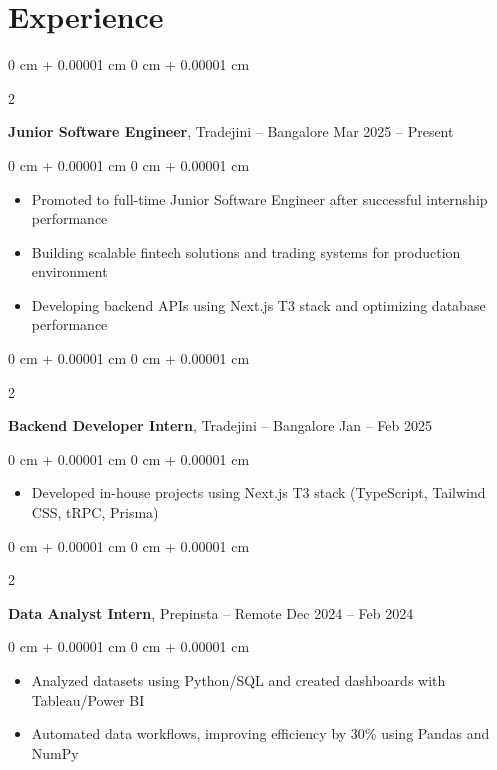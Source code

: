 \documentclass[11pt, letterpaper]{article}
\newenvironment{highlights}{
    \begin{itemize}[
        topsep=0.05 cm,
        parsep=0.05 cm,
        partopsep=0pt,
        itemsep=0pt,
        leftmargin=0 cm + 10pt
    ]
}{
    \end{itemize}
} %
\newenvironment{onecolentry}{
    \begin{adjustwidth}{
        0 cm + 0.00001 cm
    }{
        0 cm + 0.00001 cm
    }
}{
    \end{adjustwidth}
} %
\newenvironment{twocolentry}[2][]{
    \onecolentry
    \def\secondColumn{#2}
    \setcolumnwidth{\fill, 3.5 cm}
    \begin{paracol}{2}
}{
    \switchcolumn \centering \secondColumn
    \end{paracol}
    \endonecolentry
} %
\begin{document}
    \section{Experience}

    \begin{twocolentry}{
        Mar 2025 – Present
    }
        \textbf{Junior Software Engineer}, Tradejini -- Bangalore\end{twocolentry}

    \vspace{0.02 cm}
    \begin{onecolentry}
        \begin{highlights}
            \item Promoted to full-time Junior Software Engineer after successful internship performance
            \item Building scalable fintech solutions and trading systems for production environment
            \item Developing backend APIs using Next.js T3 stack and optimizing database performance
        \end{highlights}
    \end{onecolentry}

    \vspace{0.1 cm}

    \begin{twocolentry}{
        Jan – Feb 2025
    }
        \textbf{Backend Developer Intern}, Tradejini -- Bangalore\end{twocolentry}

    \vspace{0.02 cm}
    \begin{onecolentry}
        \begin{highlights}
            \item Developed in-house projects using Next.js T3 stack (TypeScript, Tailwind CSS, tRPC, Prisma)
        \end{highlights}
    \end{onecolentry}

    \vspace{0.1 cm}

    \begin{twocolentry}{
        Dec 2024 – Feb 2024
    }
        \textbf{Data Analyst Intern}, Prepinsta -- Remote\end{twocolentry}

    \vspace{0.02 cm}
    \begin{onecolentry}
        \begin{highlights}
            \item Analyzed datasets using Python/SQL and created dashboards with Tableau/Power BI
            \item Automated data workflows, improving efficiency by 30\% using Pandas and NumPy
        \end{highlights}
    \end{onecolentry}
\end{document}
